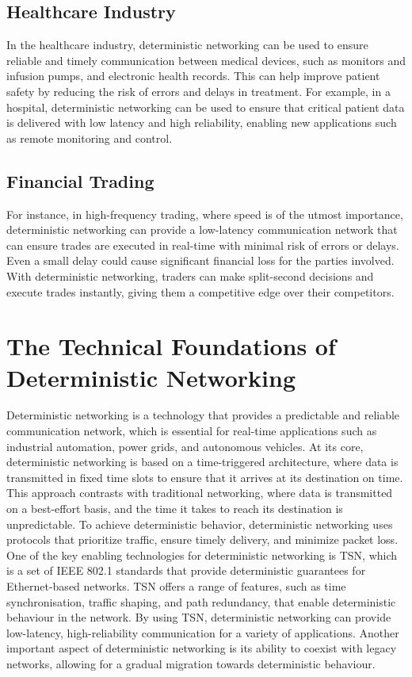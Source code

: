 \documentclass[runningheads]{llncs}
\begin{document}
\subsection*{Healthcare Industry}
In the healthcare industry, deterministic networking can be used to ensure reliable and timely communication between medical devices, such as monitors and infusion pumps, and electronic health records. This can help improve patient safety by reducing the risk of errors and delays in treatment. For example, in a hospital, deterministic networking can be used to ensure that critical patient data is delivered with low latency and high reliability, enabling new applications such as remote monitoring and control.

\subsection*{Financial Trading}
For instance, in high-frequency trading, where speed is of the utmost importance, deterministic networking can provide a low-latency communication network that can ensure trades are executed in real-time with minimal risk of errors or delays. Even a small delay could cause significant financial loss for the parties involved. With deterministic networking, traders can make split-second decisions and execute trades instantly, giving them a competitive edge over their competitors.

\section{The Technical Foundations of Deterministic Networking}
Deterministic networking is a technology that provides a predictable and reliable communication network, which is essential for real-time applications such as industrial automation, power grids, and autonomous vehicles. At its core, deterministic networking is based on a time-triggered architecture, where data is transmitted in fixed time slots to ensure that it arrives at its destination on time. This approach contrasts with traditional networking, where data is transmitted on a best-effort basis, and the time it takes to reach its destination is unpredictable. To achieve deterministic behavior, deterministic networking uses protocols that prioritize traffic, ensure timely delivery, and minimize packet loss.
One of the key enabling technologies for deterministic networking is TSN, which is a set of IEEE 802.1 standards that provide deterministic guarantees for Ethernet-based networks. TSN offers a range of features, such as time synchronisation, traffic shaping, and path redundancy, that enable deterministic behaviour in the network. By using TSN, deterministic networking can provide low-latency, high-reliability communication for a variety of applications. Another important aspect of deterministic networking is its ability to coexist with legacy networks, allowing for a gradual migration towards deterministic behaviour.
\end{document}
